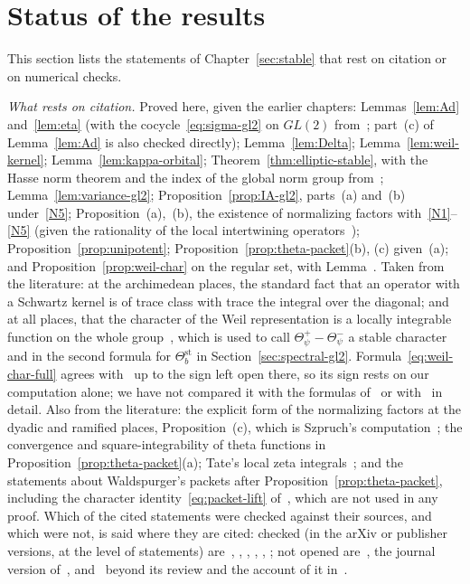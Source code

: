 \section{Status of the results}\label{sec:status7}

This section lists the statements of Chapter~\ref{sec:stable} that
rest on citation or on numerical checks.


\begin{remarkrev}\label{rem:sec7-status}
\emph{What rests on citation.} Proved here, given the earlier chapters:
Lemmas~\ref{lem:Ad} and~\ref{lem:eta} (with the cocycle~\eqref{eq:sigma-gl2}
on $GL(2)$ from~\cite{Ku69}; part~(c) of Lemma~\ref{lem:Ad} is also checked
directly); Lemma~\ref{lem:Delta}; Lemma~\ref{lem:weil-kernel};
Lemma~\ref{lem:kappa-orbital}; Theorem~\ref{thm:elliptic-stable}, with
the Hasse norm theorem and the index of the global norm group
from~\cite{CF67}; Lemma~\ref{lem:variance-gl2};
Proposition~\ref{prop:IA-gl2}, parts~(a) and~(b) under~\ref{N5};
Proposition~\normref{}(a),~(b), the existence of normalizing factors
with~\ref{N1}--\ref{N5} (given the rationality of the local intertwining
operators~\cite{Li12a});
Proposition~\ref{prop:unipotent}; Proposition~\ref{prop:theta-packet}(b),
(c) given~(a); and Proposition~\ref{prop:weil-char} on the regular set,
with Lemma~\shellref. Taken from the literature: at the
archimedean places, the standard fact that an operator with a Schwartz
kernel is of trace class with trace the integral over the diagonal; and
at all places, that the character of the Weil representation is a locally
integrable function on the whole group~\cite{Ma99,Li12a}, which is used to call $\Theta^+_\psi-\Theta^-_\psi$ a
stable character and in the second formula for $\Theta^{\mathrm{st}}_b$ in
Section~\ref{sec:spectral-gl2}. Formula~\eqref{eq:weil-char-full} agrees
with~\cite[Theorem~1C]{Th08} up to the sign left open there, so its sign
rests on our computation alone; we have not compared it with the formulas
of~\cite{Ma99,Th13} or with~\cite[Theorem~2A]{Th08} in detail. Also from
the literature: the explicit form of the normalizing factors at the
dyadic and ramified places, Proposition~\normref{}(c), which is Szpruch's
computation~\cite{Sz09,Sz16}; the convergence and square-integrability of
theta functions in Proposition~\ref{prop:theta-packet}(a); Tate's local
zeta integrals~\cite{Ta67}; and the statements about Waldspurger's packets
after Proposition~\ref{prop:theta-packet}, including the character
identity~\eqref{eq:packet-lift} of~\cite{Ad98,Sc98,Lu20}, which are not
used in any proof. Which of the cited statements were checked against
their sources, and which were not, is said where they are cited: checked
(in the arXiv or publisher versions, at the level of statements)
are~\cite[\S5]{GS12}, \cite[Theorem~1.4]{GI18}, \cite[Theorem~1C, Theorem~2A,
\S12.2]{Th08}, \cite{Sz10,Sz16}, \cite{Sc98}, \cite{Lu20}; not opened
are~\cite{Wa80,Wa91}, the journal version of~\cite{Sz09}, and~\cite{Ad98}
beyond its review and the account of it in~\cite{Sc98}.


\end{remarkrev}
